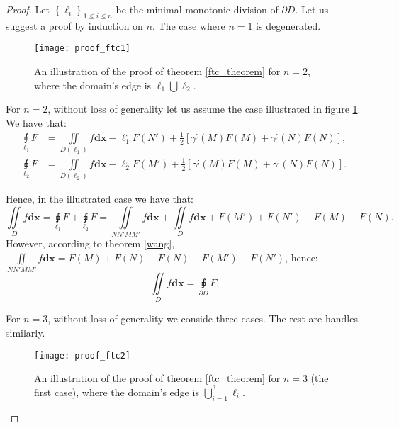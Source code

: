 \documentclass[11pt]{book}
\begin{document}
\begin{proof}Let $\left\{ \ell_{i}\right\} _{1\leq i\leq n}$ be the minimal
monotonic division of $\partial D$. Let us suggest a proof by induction
on $n$. The case where $n=1$ is degenerated.

\begin{figure}
\texttt{[image: proof\_ftc1]}
\caption{An illustration of the proof of theorem \ref{ftc_theorem} for $n=2$, where the domain’s edge is $\ell_{1}\bigcup\ell_{2}$.}
\label{ftc_proof1_fig}
\end{figure}

For $n=2$, without loss of generality let us assume the case illustrated
in figure \ref{ftc_proof1_fig}. We have that:
\begin{align*}
\underset{\ell_{1}}{\sqint}F & =\underset{D\left(\ell_{1}\right)}{\iint}f\boldsymbol{dx}-\ell_{1}^{;}F\left(N'\right)+\frac{1}{2}\left[\gamma^{;}\left(M\right)F\left(M\right)+\gamma^{;}\left(N\right)F\left(N\right)\right],\\
\underset{\ell_{2}}{\sqint}F & =\underset{D\left(\ell_{2}\right)}{\iint}f\boldsymbol{dx}-\ell_{2}^{;}F\left(M'\right)+\frac{1}{2}\left[\gamma^{;}\left(M\right)F\left(M\right)+\gamma^{;}\left(N\right)F\left(N\right)\right].
\end{align*}

Hence, in the illustrated case we have that:
\[
\underset{D}{\iint}f\boldsymbol{dx}=\underset{\ell_{1}}{\sqint}F+\underset{\ell_{2}}{\sqint}F=\underset{NN'MM'}{\iint}f\boldsymbol{dx}+\underset{D}{\iint}f\boldsymbol{dx}+F\left(M'\right)+F\left(N'\right)-F\left(M\right)-F\left(N\right).
\]
However, according to theorem \ref{wang}, $\underset{NN'MM'}{\iint}f\boldsymbol{dx}=F\left(M\right)+F\left(N\right)-F\left(N\right)-F\left(M'\right)-F\left(N'\right)$,
hence:
\[
\underset{D}{\iint}f\boldsymbol{dx}=\underset{\partial D}{\sqint}F.
\]

For $n=3$, without loss of generality we conside three cases. The
rest are handles similarly.

\begin{figure}
\texttt{[image: proof\_ftc2]}
\caption{An illustration of the proof of theorem \ref{ftc_theorem} for $n=3$ (the first case), where the domain’s edge is $\bigcup_{i=1}^{3}\ell_{i}$.}
\label{ftc_proof2_fig}
\end{figure}


\end{proof}
\end{document}
